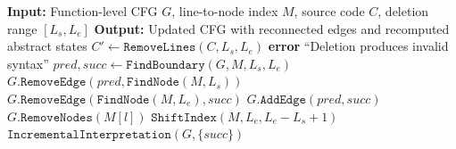 \documentclass[11pt,oneside]{report}
\theoremstyle{plain}
\theoremstyle{definition}
\theoremstyle{remark}
\begin{document}
\begin{algorithm}[!t]
\caption{Code Deletion}
\label{alg:deletion}
\begin{algorithmic}[1]
\State \textbf{Input:} Function-level CFG $G$, line-to-node index $M$, source code $C$, deletion range $[L_s, L_e]$
\State \textbf{Output:} Updated CFG with reconnected edges and recomputed abstract states
  \State $C' \gets \texttt{RemoveLines}(C, L_s, L_e)$ 
    \State \textbf{error} ``Deletion produces invalid syntax''
  \EndIf
  \State $pred, succ \gets \texttt{FindBoundary}(G, M, L_s, L_e)$ 
  \State $G.\texttt{RemoveEdge}(pred, \texttt{FindNode}(M, L_s))$ 
  \State $G.\texttt{RemoveEdge}(\texttt{FindNode}(M, L_e), succ)$
  \State $G.\texttt{AddEdge}(pred, succ)$ 
    \State $G.\texttt{RemoveNodes}(M[l])$ 
  \EndFor
  \State $\texttt{ShiftIndex}(M, L_e, L_e - L_s + 1)$ 
  \State $\texttt{IncrementalInterpretation}(G, \{succ\})$ 
\EndFunction
\end{algorithmic}
\end{algorithm}
\end{document}

